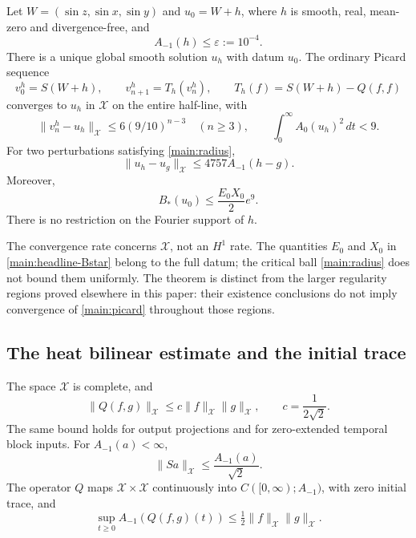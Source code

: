 \begin{theorem}
\label{main:theorem}
Let $W=(\sin z,\sin x,\sin y)$ and $u_0=W+h$, where $h$ is smooth, real,
mean-zero and divergence-free, and
\begin{equation}
 A_{-1}(h)\le\varepsilon:=10^{-4}.\label{main:radius}
\end{equation}
There is a unique global smooth solution $u_h$ with datum $u_0$. The ordinary
Picard sequence
\begin{equation}
 v_0^h=S(W+h),\qquad v_{n+1}^h=T_h(v_n^h),\qquad
 T_h(f)=S(W+h)-Q(f,f)\label{main:picard}
\end{equation}
converges to $u_h$ in $\mathcal X$ on the entire half-line, with
\begin{equation}
 \|v_n^h-u_h\|_{\mathcal X}\le6(9/10)^{n-3}\quad(n\ge3),
 \qquad \int_0^\infty A_0(u_h)^2\,dt<9.\label{main:headline}
\end{equation}
For two perturbations satisfying \eqref{main:radius},
\begin{equation}
 \|u_h-u_g\|_{\mathcal X}\le4757A_{-1}(h-g).\label{main:stability}
\end{equation}
Moreover,
\begin{equation}
 B_*(u_0)\le\frac{E_0X_0}{2}e^9.\label{main:headline-Bstar}
\end{equation}
There is no restriction on the Fourier support of $h$.
\end{theorem}

The convergence rate concerns $\mathcal X$, not an $H^1$ rate. The quantities
$E_0$ and $X_0$ in \eqref{main:headline-Bstar} belong to the full datum; the
critical ball \eqref{main:radius} does not bound them uniformly. The theorem
is distinct from the larger regularity regions proved elsewhere in this
paper: their existence conclusions do not imply convergence of
\eqref{main:picard} throughout those regions.

\subsection{The heat bilinear estimate and the initial trace}
\label{main:heat-space}

\begin{lemma}
\label{main:heat-lemma}
The space $\mathcal X$ is complete, and
\begin{equation}
 \|Q(f,g)\|_{\mathcal X}\le c\|f\|_{\mathcal X}\|g\|_{\mathcal X},
 \qquad c=\frac1{2\sqrt2}.\label{main:bilinear}
\end{equation}
The same bound holds for output projections and for zero-extended temporal
block inputs. For $A_{-1}(a)<\infty$,
\begin{equation}
 \|Sa\|_{\mathcal X}\le\frac{A_{-1}(a)}{\sqrt2}.\label{main:heat-data}
\end{equation}
The operator $Q$ maps $\mathcal X\times\mathcal X$ continuously into
$C([0,\infty);A_{-1})$, with zero initial trace, and
\begin{equation}
 \sup_{t\ge0}A_{-1}(Q(f,g)(t))
 \le\tfrac12\|f\|_{\mathcal X}\|g\|_{\mathcal X}.\label{main:trace}
\end{equation}
\end{lemma}

